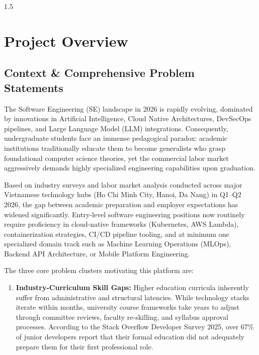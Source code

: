 \documentclass[12pt,a4paper]{report}
\begin{document}
	\tableofcontents
	\newpage
	
	\begin{spacing}{1.5}
		
		\chapter{Project Overview}
		
		\section{Context \& Comprehensive Problem Statements}
		
		The Software Engineering (SE) landscape in 2026 is rapidly evolving, dominated by innovations in Artificial Intelligence, Cloud Native Architectures, DevSecOps pipelines, and Large Language Model (LLM) integrations. Consequently, undergraduate students face an immense pedagogical paradox: academic institutions traditionally educate them to become generalists who grasp foundational computer science theories, yet the commercial labor market aggressively demands highly specialized engineering capabilities upon graduation.
		
		Based on industry surveys and labor market analysis conducted across major Vietnamese technology hubs (Ho Chi Minh City, Hanoi, Da Nang) in Q1--Q2 2026, the gap between academic preparation and employer expectations has widened significantly. Entry-level software engineering positions now routinely require proficiency in cloud-native frameworks (Kubernetes, AWS Lambda), containerization strategies, CI/CD pipeline tooling, and at minimum one specialized domain track such as Machine Learning Operations (MLOps), Backend API Architecture, or Mobile Platform Engineering.
		
		The three core problem clusters motivating this platform are:
		
		\begin{enumerate}
			\item \textbf{Industry-Curriculum Skill Gaps:} Higher education curricula inherently suffer from administrative and structural latencies. While technology stacks iterate within months, university course frameworks take years to adjust through committee reviews, faculty re-skilling, and syllabus approval processes. According to the Stack Overflow Developer Survey 2025, over 67\% of junior developers report that their formal education did not adequately prepare them for their first professional role.
			

\end{enumerate}
\end{spacing}
\end{document}
